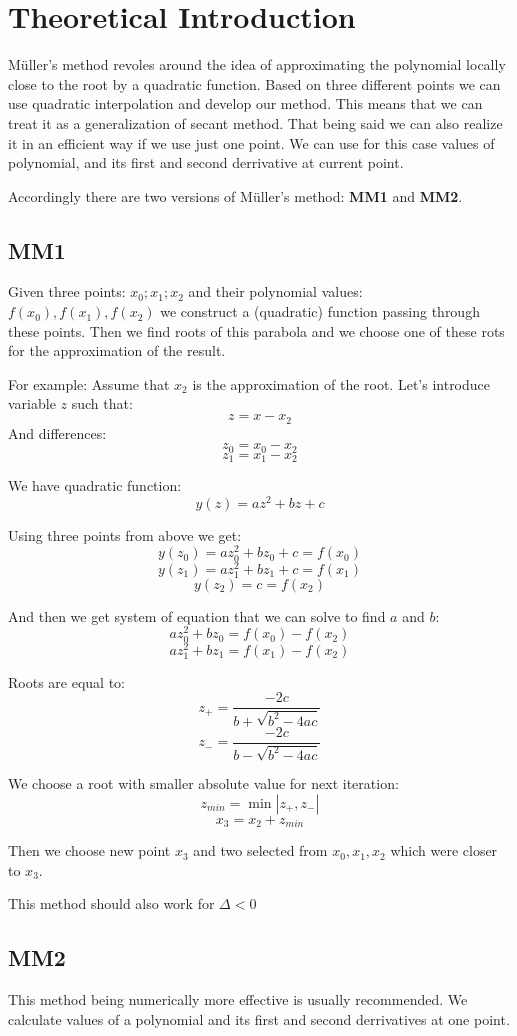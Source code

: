 \documentclass[12pt]{report}
\begin{document}
\section{Theoretical Introduction}
M{\"u}ller's method revoles around the idea of approximating the polynomial locally close to the root by a quadratic function. Based on three different points we can use quadratic interpolation and develop our method. This means that we can treat it as a generalization of secant method. That being said we can also realize it in an efficient way if we use just one point. We can use for this case values of polynomial, and its first and second derrivative at current point.

Accordingly there are two versions of M{\"u}ller's method: \textbf{MM1} and \textbf{MM2}.

\subsection{MM1}
Given three points: $x_0; x_1; x_2$ and their polynomial values: $f(x_0), f(x_1), f(x_2)$ we construct a (quadratic) function passing through these points. Then we find roots of this parabola and we choose one of these rots for the approximation of the result.

For example:
Assume that $x_2$ is the approximation of the root.
Let's introduce variable $z$ such that:
\[ z = x - x_2 \]
And differences:
\[ z_0 = x_0 - x_2 \]
\[ z_1 = x_1 - x_2 \]

We have quadratic function:
\[ y(z) = az^2 + bz + c \]

Using three points from above we get:
\[ y(z_0) = az_0^2 + bz_0 + c = f(x_0) \]
\[ y(z_1) = az_1^2 + bz_1 + c = f(x_1) \]
\[ y(z_2) = c = f(x_2) \]

And then we get system of equation that we can solve to find $a$ and $b$:
\[ az_0^2 + bz_0 = f(x_0) - f(x_2) \]
\[ az_1^2 + bz_1 = f(x_1) - f(x_2) \]

Roots are equal to:
\[ z_+ = \frac{-2c}{b+\sqrt{b^2 - 4ac}} \]
\[ z_- = \frac{-2c}{b-\sqrt{b^2 - 4ac}} \]

We choose a root with smaller absolute value for next iteration:
\[ z_{min} = \min{|z_+, z_-|} \]
\[ x_3 = x_2 + z_{min} \]

Then we choose new point $x_3$ and two selected from $x_0, x_1, x_2$ which were closer to $x_3$.

This method should also work for $\Delta < 0 $


\subsection{MM2}
This method being numerically more effective is usually recommended.
We calculate values of a polynomial and its first and second derrivatives at one point.
\end{document}
